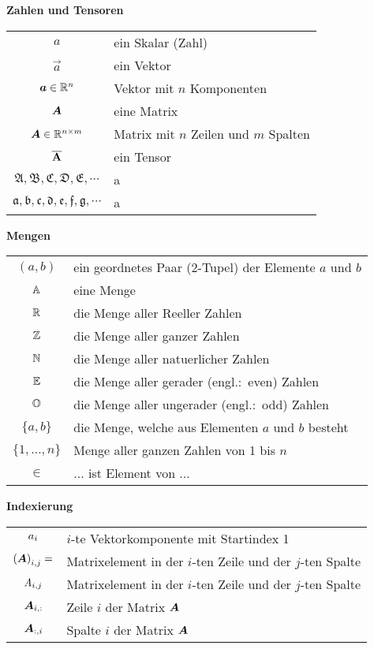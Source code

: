 \begin{center}\textbf{Zahlen und Tensoren}\end{center}
\begin{tabular}{cl}
  $a$ & ein Skalar (Zahl) \\
  $\vec{a}$ & ein Vektor \\
  $\bm{a} \in \mathbb{R}^{n}$ & Vektor mit $n$ Komponenten \\
  $\bm{A}$ & eine Matrix \\
  $\bm{A} \in \mathbb{R}^{n \times m}$ & Matrix mit $n$ Zeilen und $m$ Spalten \\
  $\overline{\mathbf{A}}$ & ein Tensor \\
  $\mathfrak{A,B,C,D,E,\cdots}$ & a \\
  $\mathfrak{a,b,c,d,e,f,g,\cdots}$ & a \\


\end{tabular}

\begin{center}\textbf{Mengen}\end{center}
\begin{tabular}{cl}
  $(a,b)$ & ein geordnetes Paar (2-Tupel) der Elemente $a$ und $b$ \\
  $\mathbb{A}$ & eine Menge \\
  $\mathbb{R}$ & die Menge aller Reeller Zahlen \\
  $\mathbb{Z}$ & die Menge aller ganzer Zahlen \\
  $\mathbb{N}$ & die Menge aller natuerlicher Zahlen \\
  $\mathbb{E}$ & die Menge aller gerader (engl.:\ even) Zahlen \\
  $\mathbb{O}$ & die Menge aller ungerader (engl.:\ odd) Zahlen \\
  $\{a,b\}$ & die Menge, welche aus Elementen $a$ und $b$ besteht \\
  $\{1,\ldots,n\}$ & Menge aller ganzen Zahlen von 1 bis $n$ \\
  $\in$ & ... ist Element von ...

\end{tabular}

\begin{center}\textbf{Indexierung}\end{center}
\begin{tabular}{cl}
  $a_i$ & $i$-te Vektorkomponente mit Startindex 1 \\
  ${(\bm{A})}_{i,j} = $ & Matrixelement in der $i$-ten Zeile und der $j$-ten Spalte \\
  $\mathit{A}_{i,j}$ & Matrixelement in der $i$-ten Zeile und der $j$-ten Spalte \\
  $\bm{A}_{i,:}$ & Zeile $i$ der Matrix $\bm{A}$ \\
  $\bm{A}_{:,i}$ & Spalte $i$ der Matrix $\bm{A}$\ \\

\end{tabular}

